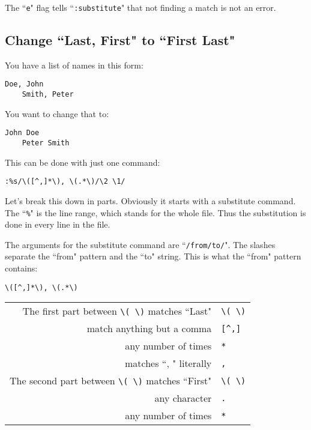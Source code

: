 The ``\texttt{e}" flag tells ``\texttt{:substitute}" that not finding a match is not an error.
\subsection{Change ``Last, First" to ``First Last"}
You have a list of names in this form:

\begin{Verbatim}[samepage=true]
    Doe, John 
    Smith, Peter 
\end{Verbatim}

You want to change that to:

\begin{Verbatim}[samepage=true]
    John Doe 
    Peter Smith 
\end{Verbatim}

This can be done with just one command:

\begin{Verbatim}[samepage=true]
 :%s/\([^,]*\), \(.*\)/\2 \1/
\end{Verbatim}

Let's break this down in parts.
Obviously it starts with a substitute command.
The ``\texttt{\%}" is the line range, which stands for the whole file.
Thus the substitution is done in every line in the file.

The arguments for the substitute command are ``\texttt{/from/to/}".
The slashes separate the ``from" pattern and the ``to" string.
This is what the ``from" pattern contains:

\begin{Verbatim}[samepage=true]
	\([^,]*\), \(.*\) 
\end{Verbatim}

\begin{center}
				\begin{longtable}{r l}
								The first part between \texttt{\textbackslash{}( \textbackslash{})} matches ``Last" & \texttt{\textbackslash{}( \textbackslash{})} \\
								match anything but a comma & \texttt{[\^{},]} \\
								any number of times & \texttt{*} \\
								matches ``, " literally & \texttt{,} \\
								The second part between \texttt{\textbackslash{}( \textbackslash{})} matches ``First" & \texttt{\textbackslash{}(  \textbackslash{})} \\
								any character & \texttt{.} \\
								any number of times & \texttt{*} \\
				\end{longtable}
\end{center}

